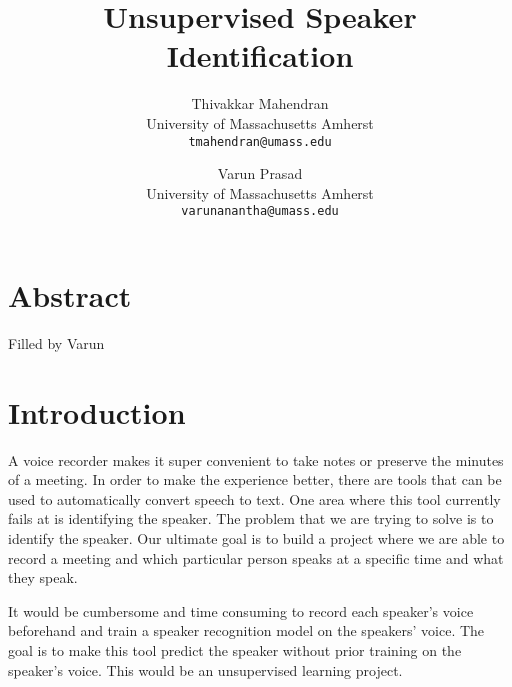 \documentclass[10pt,twocolumn,letterpaper]{article}
\begin{document}
\title{Unsupervised Speaker Identification}

\author{Thivakkar Mahendran\\
University of Massachusetts Amherst\\
{\tt\small tmahendran@umass.edu}
\and
Varun Prasad\\
University of Massachusetts Amherst\\
{\tt\small varunanantha@umass.edu}
}

\maketitle




\section{Abstract}


Filled by Varun



\section{Introduction}

A voice recorder makes it super convenient to take notes or preserve the minutes of a meeting. In order to make the experience better, there are tools that can be used to automatically convert speech to text. One area where this tool currently fails at is identifying the speaker. The problem that we are trying to solve is to identify the speaker. Our ultimate goal is to build a project where we are able to record a meeting and which particular person speaks at a specific time and what they speak.

It would be cumbersome and time consuming to record each speaker’s voice beforehand and train a speaker recognition model on the speakers’ voice. The goal is to make this tool predict the speaker without prior training on the speaker’s voice. This would be an unsupervised learning project. 
\end{document}
